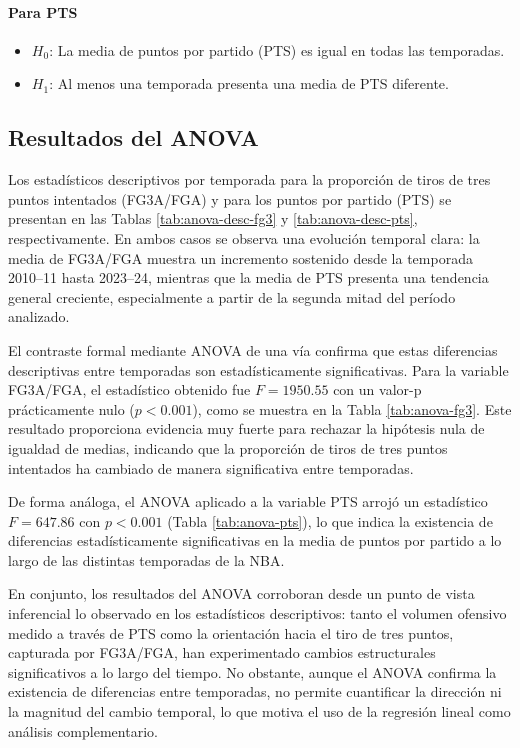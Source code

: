 \documentclass[12pt]{article}
\begin{document}
\paragraph{Para PTS}
\begin{itemize}
    \item $H_0$: La media de puntos por partido (PTS) es igual en todas las temporadas.
    \item $H_1$: Al menos una temporada presenta una media de PTS diferente.
\end{itemize}

\subsection{Resultados del ANOVA}








Los estadísticos descriptivos por temporada para la proporción de tiros de tres puntos
intentados (FG3A/FGA) y para los puntos por partido (PTS) se presentan en las Tablas
\ref{tab:anova-desc-fg3} y \ref{tab:anova-desc-pts}, respectivamente. En ambos casos se
observa una evolución temporal clara: la media de FG3A/FGA muestra un incremento sostenido
desde la temporada 2010--11 hasta 2023--24, mientras que la media de PTS presenta una
tendencia general creciente, especialmente a partir de la segunda mitad del período
analizado.

El contraste formal mediante ANOVA de una vía confirma que estas diferencias descriptivas
entre temporadas son estadísticamente significativas. Para la variable FG3A/FGA, el
estadístico obtenido fue $F = 1950.55$ con un valor-p prácticamente nulo ($p < 0.001$), como
se muestra en la Tabla \ref{tab:anova-fg3}. Este resultado proporciona evidencia muy fuerte
para rechazar la hipótesis nula de igualdad de medias, indicando que la proporción de tiros
de tres puntos intentados ha cambiado de manera significativa entre temporadas.

De forma análoga, el ANOVA aplicado a la variable PTS arrojó un estadístico
$F = 647.86$ con $p < 0.001$ (Tabla \ref{tab:anova-pts}), lo que indica la existencia de
diferencias estadísticamente significativas en la media de puntos por partido a lo largo de
las distintas temporadas de la NBA.

En conjunto, los resultados del ANOVA corroboran desde un punto de vista inferencial lo
observado en los estadísticos descriptivos: tanto el volumen ofensivo medido a través de
PTS como la orientación hacia el tiro de tres puntos, capturada por FG3A/FGA, han
experimentado cambios estructurales significativos a lo largo del tiempo. No obstante,
aunque el ANOVA confirma la existencia de diferencias entre temporadas, no permite
cuantificar la dirección ni la magnitud del cambio temporal, lo que motiva el uso de la
regresión lineal como análisis complementario.
\end{document}

